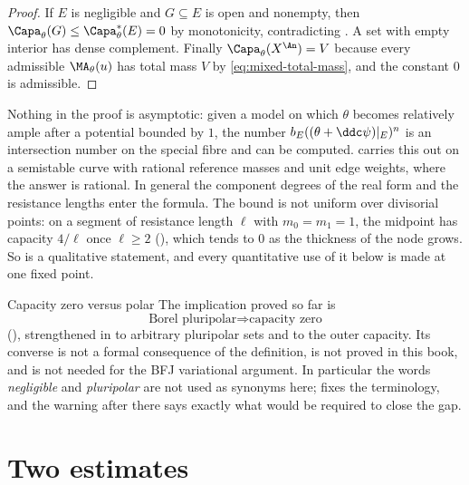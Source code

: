 \begin{proof}
If \(E\) is negligible and \(G\subseteq E\) is open and nonempty, then
\(\Capa_\theta(G)\leq\Capa_\theta^*(E)=0\) by monotonicity, contradicting
.  A set with empty interior has dense
complement.  Finally \(\Capa_\theta(X^{\An})=V\) because every admissible
\(\MA_\theta(u)\) has total mass \(V\) by
\eqref{eq:mixed-total-mass}, and the constant \(0\) is admissible.
\end{proof}

\begin{remark}
\label{rem:ch25-divisorial-explicit}
Nothing in the proof is asymptotic: given a model on which \(\theta\) becomes
relatively ample after a potential bounded by \(1\), the number
\(b_E((\theta+\ddc\psi)|_E)^n\) is an intersection number on the special
fibre and can be computed.   carries this
out on a semistable curve with rational reference masses and unit edge
weights, where the answer is rational.  In general the component degrees
of the real form and the resistance lengths enter the formula.  The bound
is not uniform over divisorial points: on a segment of resistance length
\(\ell\) with \(m_0=m_1=1\), the midpoint has capacity
\(4/\ell\) once \(\ell\geq2\)
(), which tends to \(0\) as the thickness
of the node grows.  So  is a
qualitative statement, and every quantitative use of it below is made at one
fixed point.
\end{remark}

\begin{warning}{Capacity zero versus polar}
The implication proved so far is
\[
       \text{Borel pluripolar}\Longrightarrow\text{capacity zero}
\]
(), strengthened in
 to arbitrary pluripolar sets and to the
outer capacity.  Its converse is not a formal consequence of the definition,
is not proved in this book, and is not needed for the BFJ variational
argument.  In particular the words \emph{negligible} and \emph{pluripolar}
are not used as synonyms here;  fixes the
terminology, and the warning after
 there says exactly what would be
required to close the gap.
\end{warning}

\section{Two estimates}
\label{sec:ch25-estimates}


